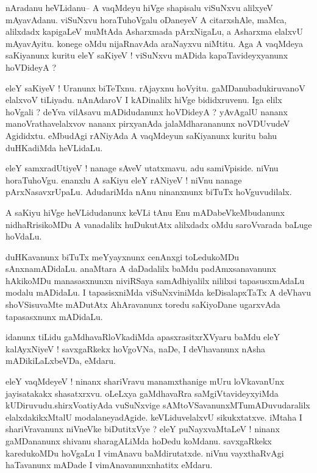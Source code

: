 \documentclass{article}
\begin{document}
\begin{mn}%
nAradanu heVLidanu-- A vaqMdeyu hiVge shapisalu viSuNxvu alilxyeV mAyavAdanu. viSuNxvu 
horaTuhoVgalu oDaneyeV A citarxshAle, maMca, alilxdadx kapigaLeV muMtAda Asharxmada 
pArxNigaLu, a Asharxma elalxvU mAyavAyitu. konege oMdu nijaRnavAda araNayxvu niMtitu. Aga A 
vaqMdeya saKiyanunx kuritu eleY saKiyeV ! viSuNxvu mADida kapaTavideyxyanunx hoVDideyA ?
\end{mn}

\begin{mn}%
eleY saKiyeV ! Uranunx biTeTxnu. rAjayxnu hoVyitu. gaMDanubadukiruvanoV elalxvoV tiLiyadu. 
nAnAdaroV I kADinalilx hiVge bididxruvenu. Iga elilx hoVgali ? deYva vilAsavu mADidudanunx 
hoVDideyA ? yAvAgalU nananx manoVrathavelalxvov nananx pirxyanAda jalaMdharananunx 
noVDUvudeV Agididxtu. eMbudAgi rANiyAda A vaqMdeyun saKiyanunx kuritu bahu duHKadiMda 
heVLidaLu.
\end{mn}

\begin{mn}%
eleY samxradUtiyeV ! nanage sAveV utatxmavu. adu samiVpiside. niVnu horaTuhoVgu. enanxlu A 
saKiyu eleY rANiyeV ! niVnu nanage pArxNasavxrUpaLu. AdudariMda nAnu ninanxnunx biTuTx 
hoVguvudilalx.
\end{mn}

\begin{mn}%
A saKiyu hiVge heVLidudanunx keVLi tAnu Enu mADabeVkeMbudanunx nidhaRrisikoMDu A vanadalilx 
huDukutAtx alilxdadx oMdu saroVvarada baLuge hoVdaLu.
\end{mn}

\begin{mn}%
duHKavanunx biTuTx meYyayxnunx cenAnxgi toLedukoMDu sAnxnamADidaLu. anaMtara A daDadalilx 
baMdu padAmxsanavanunx hAkikoMDu manasasxnunxn niviRSaya samAdhiyalilx nililxsi 
tapasusxmAdaLu modalu mADidaLu. I tapasisxniMda viSuNxviniMda keDisalapxTaTx A deVhavu 
shoVSisuvaMte mADutAtx AhAravanunx toredu saKiyoDane ugarxvAda tapasasxnunx mADidaLu.
\end{mn}

\begin{mn}%
idanunx tiLidu gaMdhavaRloVkadiMda apasxrasitxrXVyaru baMdu eleY kalAyxNiyeV ! savxgaRkekx 
hoVgoVNa, naDe, I deVhavanunx nAsha mADikiLaLxbeVDa, eMdaru.
\end{mn}

\begin{mn}%
eleY vaqMdeyeV ! ninanx shariVravu manamxthanige mUru loVkavanUnx jayisatakakx shasatxrxvu. 
oLeLxya gaMdhavaRra saMgiVtavideyxyiMda kUDiruvudu.shirxVoatiyAda vuSuNxvige 
sAMtoVSavanunxMTumADuvudaralilx elalxdakikxMtalU modalaneyadAgide. keVLiduvelalxvU 
sikukxtatxve. iMtaha I shariVravanunx niVneVke biDutitxVye ? eleY puNayxvaMtaLeV ! ninanx 
gaMDananunx shivanu sharagALiMda hoDedu koMdanu. savxgaRkekx karedukoMDu hoVgaLu I vimAnavu 
baMdirutatxde. niVnu vayxthaRvAgi haTavanunx mADade I vimAnavanunxnhatitx eMdaru.
\end{mn}
\end{document}
